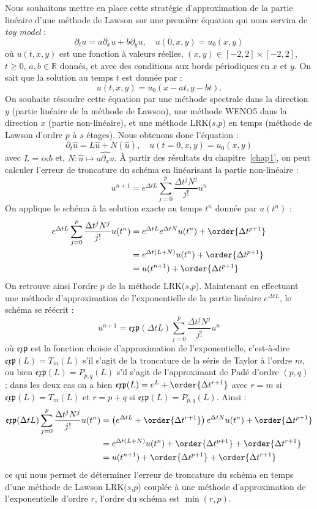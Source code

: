 Nous souhaitons mettre en place cette stratégie d'approximation de la partie linéaire d'une méthode de Lawson sur une première équation qui nous servira de \emph{toy model} :
$$
  \partial_t u = a\partial_x u + b\partial_y u,\quad u(0,x,y)=u_0(x,y)
$$
où $u(t,x,y)$ est une fonction à valeurs réelles, $(x,y)\in[-2,2]\times[-2,2]$, $t\geq0$, $a,b\in\mathbb{R}$ donnés, et avec des conditions aux bords périodiques en $x$ et $y$. On sait que la solution au temps $t$ est donnée par :
$$
  u(t,x,y) = u_0(x-at,y-bt).
$$
On souhaite résoudre cette équation par une méthode spectrale dans la direction $y$ (partie linéaire de la méthode de Lawson), une méthode WENO5 dans la direction $x$ (partie non-linéaire), et une méthode LRK($s$,$p$) en temps (méthode de Lawson d'ordre $p$ à $s$ étages). Nous obtenons donc l'équation :
$$
  \partial_t \hat{u} = L\hat{u} + N(\hat{u}),\quad u(t=0,x,y) = u_0(x,y)
$$
avec $L = i\kappa b$ et, $N:\hat{u}\mapsto\widehat{a\partial_xu}$. À partir des résultats du chapitre~\ref{chap1}, on peut calculer l'erreur de troncature du schéma en linéarisant la partie non-linéaire :
$$
  u^{n+1} = e^{\Delta tL}\sum_{j=0}^{p}\frac{\Delta t^jN^j}{j!}u^n
$$
On applique le schéma à la solution exacte au temps $t^n$ donnée par $u(t^n)$ :
$$
  \begin{aligned}
    e^{\Delta tL}\sum_{j=0}^{p}\frac{\Delta t^jN^j}{j!}u(t^n) &= e^{\Delta t L}e^{\Delta t N}u(t^n) + \order{\Delta t^{p+1}} \\
      &= e^{\Delta t(L+N)}u(t^n) + \order{\Delta t^{p+1}} \\
      &= u(t^{n+1}) + \order{\Delta t^{p+1}}
  \end{aligned}
$$
On retrouve ainsi l'ordre $p$ de la méthode LRK($s$,$p$). Maintenant en effectuant une méthode d'approximation de l'exponentielle de la partie linéaire $e^{\Delta tL}$, le schéma se réécrit :
$$
  u^{n+1} = \mathfrak{exp}(\Delta tL)\sum_{j=0}^{p}\frac{\Delta t^jN^j}{j!}u^n
$$
où $\mathfrak{exp}$ est la fonction choisie d'approximation de l'exponentielle, c'est-à-dire $\mathfrak{exp}(L) = T_m(L)$ s'il s'agit de la troncature de la série de Taylor à l'ordre $m$, ou bien $\mathfrak{exp}(L) = P_{p,q}(L)$ s'il s'agit de l'approximant de Padé d'ordre $(p,q)$ ; dans les deux cas on a bien $\mathfrak{exp}(L) = e^{L} + \order{\Delta t^{r+1}}$ avec $r = m$ si $\mathfrak{exp}(L) = T_m(L)$ et $r = p+q$ si $\mathfrak{exp}(L) = P_{p,q}(L)$. Ainsi :
$$
  \begin{aligned}
    \mathfrak{exp}(\Delta tL)\sum_{j=0}^{p}\frac{\Delta t^jN^j}{j!}u(t^n) &= \left(e^{\Delta t L} + \order{\Delta t^{r+1}}\right)e^{\Delta t N}u(t^n) + \order{\Delta t^{p+1}} \\
      &= e^{\Delta t(L+N)}u(t^n) + \order{\Delta t^{p+1}} + \order{\Delta t^{r+1}} \\
      &= u(t^{n+1}) + \order{\Delta t^{p+1}} + \order{\Delta t^{r+1}}
  \end{aligned}
$$
ce qui nous permet de déterminer l'erreur de troncature du schéma en temps d'une méthode de Lawson LRK($s$,$p$) couplée à une méthode d'approximation de l'exponentielle d'ordre $r$, l'ordre du schéma est $\min(r,p)$.

